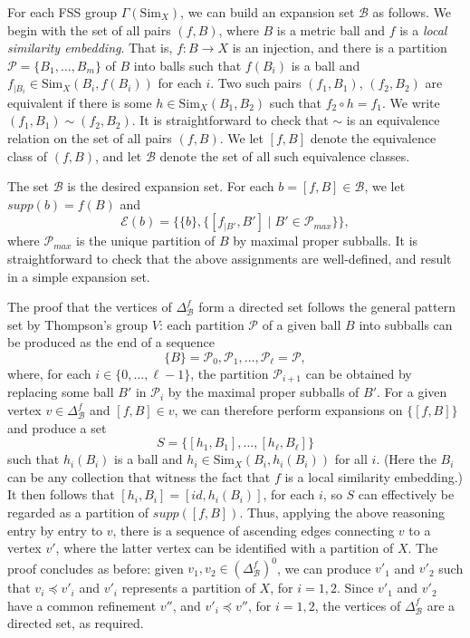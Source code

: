 \documentclass{amsart}
\newtheorem{standing assumption}[theorem]{Standing Assumption}
\begin{document}
For each FSS group $\Gamma(\mathrm{Sim}_{X})$, we can build an expansion set $\mathcal{B}$ as follows. We begin with the set of all pairs $(f,B)$, where $B$ is a metric ball and $f$ is a \emph{local similarity embedding}. That is, $f: B \rightarrow X$ is an injection, and there is a partition
$\mathcal{P} = \{ B_{1}, \ldots, B_{m} \}$ of $B$ into balls such that $f(B_{i})$ is a ball
and $f_{\mid B_{i}} \in \mathrm{Sim}_{X}(B_{i}, f(B_{i}))$ for each $i$. Two such pairs $(f_{1},B_{1})$,
$(f_{2},B_{2})$ are equivalent if there is some $h \in \mathrm{Sim}_{X}(B_{1},B_{2})$
such that $f_{2} \circ h = f_{1}$. We write $(f_{1},B_{1}) \sim (f_{2},B_{2})$. It is straightforward to check that $\sim$ is an equivalence relation on the set of all pairs $(f,B)$. We let $[f,B]$ denote the equivalence class of $(f,B)$, and let $\mathcal{B}$ denote the set of all such equivalence classes.

The set $\mathcal{B}$ is the desired expansion set. For each $b = [f,B] \in \mathcal{B}$, we let
$supp(b) = f(B)$ and 
\[ \mathcal{E}(b) = \{ \{ b \}, \{ [f_{\mid B'},B'] \mid B' \in \mathcal{P}_{max} \}\}, \]
where  $\mathcal{P}_{max}$ is the unique partition of $B$ by maximal proper subballs. It is straightforward to check that the above assignments are well-defined, and result in a simple expansion set.

The proof that the vertices of $\Delta^{f}_{\mathcal{B}}$ form a directed set follows the general pattern set by Thompson's group $V$: each partition 
$\mathcal{P}$ of a given ball $B$ into subballs can be produced as the end of a sequence
\[ \{ B \} = \mathcal{P}_{0}, \mathcal{P}_{1}, \ldots, \mathcal{P}_{\ell} = \mathcal{P}, \]
where, for each $i \in \{0, \ldots, \ell-1 \}$, the partition $\mathcal{P}_{i+1}$ can be obtained by replacing some ball $B'$ in $\mathcal{P}_{i}$ by the maximal proper subballs of $B'$. For a given vertex $v \in \Delta^{f}_{\mathcal{B}}$ and $[f,B] \in v$, we can therefore perform expansions
on $\{ [f,B] \}$ and produce a set
\[ S = \{ [h_{1},B_{1}], \ldots, [h_{\ell},B_{\ell}] \} \]
such that $h_{i}(B_{i})$ is a ball and
$h_{i} \in \mathrm{Sim}_{X}(B_{i}, h_{i}(B_{i}))$ for all $i$.
(Here the $B_{i}$ can be any collection that witness the fact that 
$f$ is a local similarity embedding.) It then follows that 
$[h_{i}, B_{i}] = [id, h_{i}(B_{i})]$, for each $i$, so $S$ can effectively be regarded as a partition of $supp([f,B])$. Thus, applying the above reasoning entry by entry to $v$, there is a sequence of ascending edges connecting $v$ to a vertex $v'$, where the latter
vertex can be identified with a partition of $X$. The proof concludes as before: given $v_{1}, v_{2} \in \left( \Delta^{f}_{\mathcal{B}} \right)^{0}$, we can produce $v'_{1}$ and $v'_{2}$ such that 
$v_{i} \preceq v'_{i}$ and $v'_{i}$ represents a partition of $X$, for $i=1,2$. Since $v'_{1}$ and $v'_{2}$ have a common refinement $v''$,
and $v'_{i} \preceq v''$, for $i=1,2$, the vertices of $\Delta^{f}_{\mathcal{B}}$ are a directed set, as required.
\end{document}
